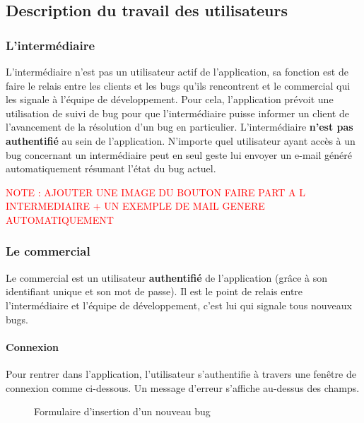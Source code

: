 \documentclass{article}[12pt]
\begin{document}
\subsection{Description du travail des utilisateurs}
\subsubsection{L'intermédiaire}
L'intermédiaire n'est pas un utilisateur actif de l'application, sa fonction est de faire le relais entre les clients et les bugs qu'ils rencontrent et le commercial qui les signale à l'équipe de développement. Pour cela, l'application prévoit une utilisation de suivi de bug pour que l'intermédiaire puisse informer un client de l'avancement de la résolution d'un bug en particulier. L'intermédiaire  \textbf{n'est pas authentifié} au sein de l'application. N'importe quel utilisateur ayant accès à un bug concernant un intermédiaire peut en seul geste lui envoyer un e-mail généré automatiquement résumant l'état du bug actuel.

\textcolor{red}{NOTE : AJOUTER UNE IMAGE DU BOUTON FAIRE PART A L INTERMEDIAIRE + UN EXEMPLE DE MAIL GENERE AUTOMATIQUEMENT}

\subsubsection{Le commercial}
Le commercial est un utilisateur \textbf{authentifié} de l'application (grâce à son identifiant unique et son mot de passe). Il est le point de relais entre l'intermédiaire et l'équipe de développement, c'est lui qui signale tous nouveaux bugs. 
\paragraph{Connexion}
Pour rentrer dans l'application, l'utilisateur s'authentifie à travers une fenêtre de connexion comme ci-dessous. Un message d'erreur s'affiche au-dessus des champs.
\begin{figure}[H]
	\centering
	\caption{Formulaire d'insertion d'un nouveau bug}
\end{figure}
\end{document}
